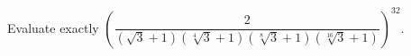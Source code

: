 Evaluate exactly $\left(\dfrac{2}{(\sqrt3+1)(\sqrt[4]3+1)(\sqrt[8]3+1)(\sqrt[16]3+1)}\right)^{32}$.
